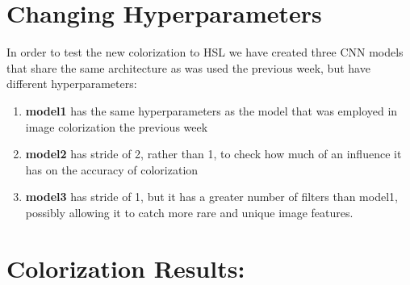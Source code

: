 \documentclass[]{article}
\begin{document}
	\section{Changing Hyperparameters}
	
	In order to test the new colorization to HSL we have created three CNN models that share the same architecture as was used the previous week, but have different hyperparameters: 
	\begin{enumerate}
		\item \textbf{model1} has the same hyperparameters as the model that was employed in image colorization the previous week
		\item \textbf{model2} has stride of 2, rather than 1, to check how much of an influence it has on the accuracy of colorization
		\item \textbf{model3} has stride of 1, but it has a greater number of filters than model1, possibly allowing it to catch more rare and unique image features.
	\end{enumerate}
	
	\section{Colorization Results:}
	
\end{document}
